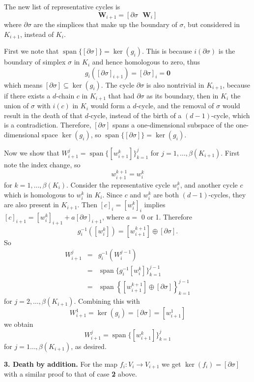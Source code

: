 \documentclass[12pt]{article}
\DeclareMathOperator{\spn}{span}
\begin{document}
The new list of representative cycles is
\[ \mathbf{W}_{i+1} = [\partial\sigma \mbox{ } \mathbf{W}_i] \]
where $\partial\sigma$ are the simplices that make up the boundary of $\sigma$, but considered in $K_{i+1}$, instead of $K_i$.

First we note that $\spn\{[\partial\sigma]\} = \ker(g_i)$. This is because $i(\partial\sigma)$ is the boundary of simplex $\sigma$ in $K_i$ and hence homologous to zero, thus
\[ g_i([\partial\sigma]_{i+1}) = [\partial\sigma]_i = \textbf{0} \]
which means $[\partial\sigma] \subseteq \ker(g_i)$. The cycle $\partial\sigma$ is also nontrivial in $K_{i+1}$, because if there exists a $d$-chain $c$ in $K_{i+1}$ that had $\partial\sigma$ as its boundary, then in $K_i$ the union of $\sigma$ with $i(c)$ in $K_i$ would form a $d$-cycle, and the removal of $\sigma$ would result in the death of that $d$-cycle, instead of the birth of a $(d-1)$-cycle, which is a contradiction. Therefore, $[\partial\sigma]$ spans a one-dimensional subspace of the one-dimensional space $\ker(g_i)$, so $\spn\{[\partial\sigma]\} = \ker(g_i)$.

Now we show that $W_{i+1}^j = \spn \{[w_{i+1}^k]\}_{k=1}^j$ for $j = 1,\ldots, {\beta(K_{i+1})}$. First note the index change, so
\[ w_{i+1}^{k+1} = w_i^k \]
for $k = 1,\ldots,\beta(K_i)$. Consider the representative cycle $w_i^k$, and another cycle $c$ which is homologous to $w_i^k$ in $K_i$. Since $c$ and $w_i^k$ are both $(d-1)$-cycles, they are also present in $K_{i+1}$. Then $[c]_i = [w_i^k]_i$ implies $[c]_{i+1} = [w_i^k]_{i+1} + a[\partial\sigma]_{i+1}$, where $a = $ 0 or 1. Therefore
\[ g_i^{-1}([w_i^k]) = [w_{i+1}^{k+1}]\oplus[\partial\sigma]. \]
So
\begin{eqnarray*}
W_{i+1}^j & = & g_i^{-1}(W_i^{j-1}) \\
& = & \spn \{g_i^{-1}[w_i^k]\}_{k=1}^{j-1} \\
& = & \spn \left\{[w_{i+1}^{k+1}]\oplus[\partial\sigma]\right\}_{k=1}^{j-1}
\end{eqnarray*}
for $j = 2,\ldots,\beta(K_{i+1})$. Combining this with
\[ W_{i+1}^1 = \ker(g_i) = [\partial\sigma] = [w_{i+1}^1] \]
we obtain
\[ W_{i+1}^j = \spn \{[w_{i+1}^k]\}_{k=1}^j \]
for $j = 1\ldots,\beta(K_{i+1})$, as desired.

\textbf{3. Death by addition.} For the map $f_i: V_i \to V_{i+1}$ we get $\ker(f_i) = [\partial\sigma]$ with a similar proof to that of case \textbf{2} above.
\end{document}
